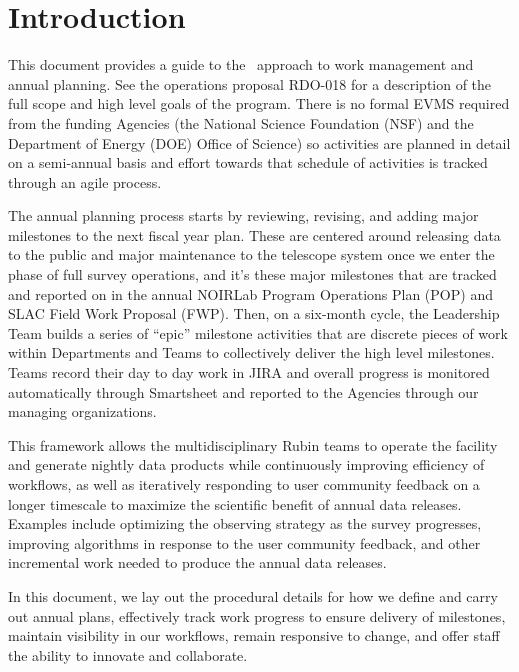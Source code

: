 \section{Introduction}

This document provides a guide to the \VRO\ approach to work management and annual planning.
See the operations proposal \gls{RDO}-018 for a description of the full scope and high level goals of the program.
There is no formal \gls{EVMS} required from the funding Agencies (the \gls{National Science Foundation} (\gls{NSF}) and the \gls{Department of Energy} (DOE) Office of Science) so activities are planned in detail on a semi-annual basis and effort towards that schedule of activities is tracked through an agile process.

The annual planning process starts by reviewing, revising, and adding major milestones to the next fiscal year plan.
These are centered around releasing data to the public and major maintenance to the telescope system once we enter the phase of full survey operations, and it's these major milestones that are tracked and reported on in the annual \gls{NOIRLab} Program Operations Plan (\gls{POP}) and \gls{SLAC} Field Work Proposal (FWP).
Then, on a six-month \gls{cycle}, the Leadership Team builds a series of ``epic'' milestone activities that are discrete pieces of work within Departments and Teams to collectively deliver the high level milestones.
Teams record their day to day work in \gls{JIRA} and overall progress is monitored automatically through Smartsheet and reported to the Agencies through our managing organizations.

This framework allows the multidisciplinary Rubin teams to operate the facility and generate nightly data products while continuously improving efficiency of workflows,
as well as iteratively responding to user community feedback on a longer timescale to maximize the scientific benefit of annual data releases.
Examples include optimizing the observing strategy as the survey progresses, improving algorithms in response to the user community feedback,
and other incremental work needed to produce the annual data releases.

In this document, we lay out the procedural details for how we define and carry out annual plans, effectively track work progress to ensure delivery of milestones, maintain visibility in our workflows, remain responsive to change, and offer staff the ability to innovate and collaborate.


